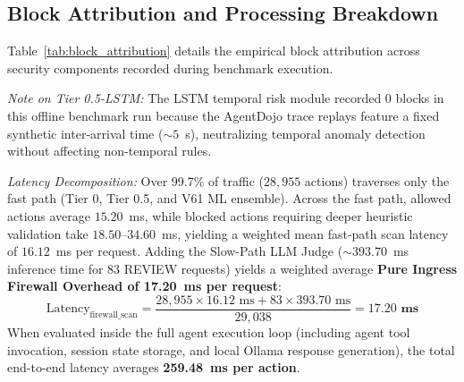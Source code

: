 \documentclass[runningheads]{llncs}
\begin{document}
\subsection{Block Attribution and Processing Breakdown}
Table~\ref{tab:block_attribution} details the empirical block attribution across security components recorded during benchmark execution.

\begin{table}[t]
\caption{Empirical Block Attribution across Security Layers on the 29,038 Record Benchmark}
\label{tab:block_attribution}
\centering
{}
\end{table}

\textit{Note on Tier 0.5-LSTM:} The LSTM temporal risk module recorded 0 blocks in this offline benchmark run because the AgentDojo trace replays feature a fixed synthetic inter-arrival time ($\sim 5$~s), neutralizing temporal anomaly detection without affecting non-temporal rules.

\textit{Latency Decomposition:} Over 99.7\% of traffic ($28,955$ actions) traverses only the fast path (Tier 0, Tier 0.5, and V61 ML ensemble). Across the fast path, allowed actions average $15.20$~ms, while blocked actions requiring deeper heuristic validation take $18.50\text{--}34.60$~ms, yielding a weighted mean fast-path scan latency of $16.12$~ms per request. Adding the Slow-Path LLM Judge ($\sim 393.70$~ms inference time for 83 REVIEW requests) yields a weighted average \textbf{Pure Ingress Firewall Overhead of 17.20~ms per request}:
\begin{equation}
\text{Latency}_{\text{firewall\_scan}} = \frac{28,955 \times 16.12\text{ ms} + 83 \times 393.70\text{ ms}}{29,038} = \mathbf{17.20\text{ ms}}
\end{equation}
When evaluated inside the full agent execution loop (including agent tool invocation, session state storage, and local Ollama response generation), the total end-to-end latency averages \textbf{259.48~ms per action}.
\end{document}
